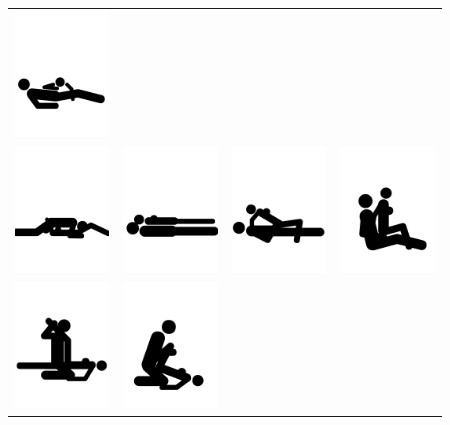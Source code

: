 \begin{tabular}{cccc}
\includegraphics[width=2.5cm]{20waysto/f13.png}\\
\includegraphics[width=2.5cm]{20waysto/f20.png}&
\includegraphics[width=2.5cm]{20waysto/f21.png}&
\includegraphics[width=2.5cm]{20waysto/f22.png}&
\includegraphics[width=2.5cm]{20waysto/f23.png}\\
\includegraphics[width=2.5cm]{20waysto/f30.png}&
\includegraphics[width=2.5cm]{20waysto/f31.png}&

\end{tabular}
